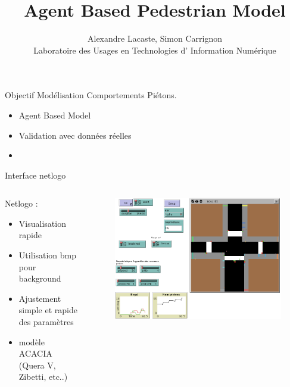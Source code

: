 \documentclass[hyperref={pdfpagelabel=false},8pt, handout=show,show notes]{beamer}
\author[]{Alexandre Lacaste, Simon Carrignon\\ 
 Laboratoire des Usages en Technologies d' Information Numérique
}
\title{Agent Based Pedestrian Model}
\begin{document}
\begin{frame}
 \maketitle
\end{frame}

\begin{frame}
 \begin{beamerboxesrounded}{Objectif}
  Mod\'elisation Comportements Pi\'etons.
  \begin{itemize}
   \item Agent Based Model
   \item Validation avec donn\'ees r\'eelles 
   \item 
  \end{itemize}


 \end{beamerboxesrounded}
 
\end{frame}

\begin{frame}{Interface netlogo}
\begin{columns}
\begin{column}{.45\textwidth}
Netlogo :
\begin{itemize}
 \item Visualisation rapide
 \item Utilisation bmp pour background
 \item Ajustement simple et rapide des param\`etres
 \item mod\`ele ACACIA (Quera V, Zibetti, etc..)
\end{itemize}

\end{column}

\begin{column}{.5\textwidth}
\begin{figure}
 \centering
 \includegraphics[width=\textwidth]{images/netlogo-printscreen}
\end{figure}
\end{column}

\end{columns}
 
\end{frame}
\end{document}
